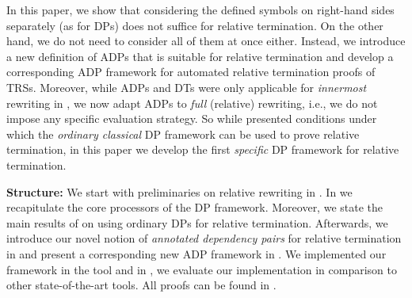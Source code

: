 In this paper, we show that considering the defined symbols on right-hand sides
separately (as for DPs) does not suffice for relative termination. On the other hand,
we do not need to consider all of them at once either.
Instead, we introduce a new definition of ADPs that is suitable for relative
termination and develop a corresponding ADP framework for automated relative
termination proofs of TRSs.
Moreover, while ADPs and DTs were only applicable for \emph{innermost}  rewriting in
\cite{FLOPS2024,kassinggiesl2023iAST,noschinski2013analyzing}, we now adapt ADPs to \emph{full}
(relative) rewriting, i.e., we do not impose any specific evaluation strategy.
So while \cite{iborra2017relative} presented conditions under which the \emph{ordinary
classical} DP framework can be used to 
prove relative termination, in this paper we develop the first \emph{specific} DP
framework for relative termination.

\medskip

\noindent
\textbf{Structure:} We start with preliminaries on relative rewriting in
.
In  we recapitulate the core processors of the DP framework.
Moreover, we state the main results of \cite{iborra2017relative} on using ordinary
DPs for relative termination.
Afterwards, we introduce our novel notion of \emph{annotated dependency pairs} for
relative termination in 
and present a corresponding new ADP
framework in .
We implemented our framework in the tool \aprove{} and
in  , we evaluate our implementation in comparison to
other state-of-the-art  tools.
 All proofs can be found in .
